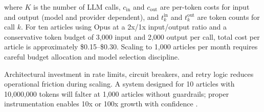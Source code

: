 where $K$ is the number of LLM calls, $c_{\mathrm{in}}$ and $c_{\mathrm{out}}$ are per-token costs for input and output (model and provider dependent), and $t_k^{\mathrm{in}}$ and $t_k^{\mathrm{out}}$ are token counts for call $k$. For ten articles using Opus at a 2x/1x input/output ratio and a conservative token budget of 3{,}000 input and 2{,}000 output per call, total cost per article is approximately \$0.15–\$0.30. Scaling to 1{,}000 articles per month requires careful budget allocation and model selection discipline.

Architectural investment in rate limits, circuit breakers, and retry logic reduces operational friction during scaling. A system designed for 10 articles with 10{,}000{,}000 tokens will falter at 1{,}000 articles without guardrails; proper instrumentation enables 10x or 100x growth with confidence \cite{CrewAI2024}.